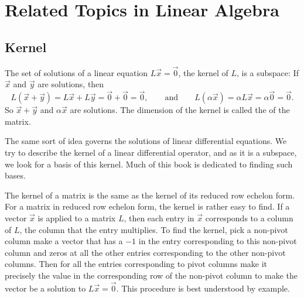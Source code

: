 \section{Related Topics in Linear Algebra} \label{sec:kernel}



\subsection{Kernel}

The set of solutions of a linear equation $L\vec{x} = \vec{0}$, 
the kernel of $L$, is a subspace:
If $\vec{x}$ and $\vec{y}$ are solutions,
then
\begin{equation*}
L(\vec{x}+\vec{y}) = 
L\vec{x}+L\vec{y} = 
\vec{0}+\vec{0} = \vec{0} ,
\qquad \text{and} \qquad
L(\alpha \vec{x}) = 
\alpha L \vec{x} = 
\alpha \vec{0} = \vec{0}.
\end{equation*}
So $\vec{x}+\vec{y}$ and $\alpha \vec{x}$ are solutions.
The dimension of the kernel is called the \emph{} of the
matrix.

The same sort of idea governs the solutions of linear differential
equations.  We try to describe the kernel of a linear differential 
operator, and as it is a subspace, we look for a basis of this
kernel.  Much of this book is dedicated to finding such bases.

The kernel of a matrix is the same as the kernel of its reduced row echelon
form.  For a matrix in reduced row echelon form, the kernel is rather easy to
find.  If a vector $\vec{x}$ is applied to a matrix $L$, then each entry in
$\vec{x}$ corresponds to a column of $L$, the column that the entry
multiplies.
To find the kernel,
pick a 
non-pivot column make a vector that has a $-1$ in the entry
corresponding to this non-pivot column and zeros at all the other entries
corresponding to the other non-pivot columns.
Then for all the entries
corresponding to pivot columns make it precisely the value in the
corresponding row of the non-pivot column to make the vector be a
solution to $L \vec{x} = \vec{0}$.
This procedure is best understood by example.

